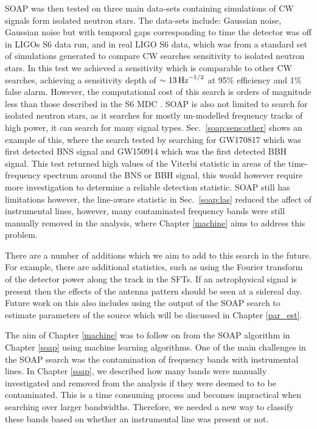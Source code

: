 SOAP was then tested on three main data-sets containing simulations of \gls{CW} signals form isolated neutron stars.
The data-sets include: Gaussian noise, Gaussian noise but with temporal gaps corresponding to time the detector was off in \glspl{LIGO} S6 data run, and in real \gls{LIGO} S6 data, which was from a standard set of simulations generated to compare \gls{CW} searches sensitivity to isolated neutron stars.
In this test we achieved a sensitivity which is comparable to other \gls{CW} searches, achieving a sensitivity depth of $\sim 13 \, \rm{Hz}^{-1/2}$ at 95\% efficiency and 1\% false alarm. 
However, the computational cost of this search is orders of magnitude less than those described in the S6 \gls{MDC} \citep{walsh2016ComparisonMethods}. 
SOAP is also not limited to search for isolated neutron stars, as it searches for mostly un-modelled frequency tracks of high power, it can search for many signal types.
Sec.~\ref{soap:sens:other} shows an example of this, where the search tested by searching for GW170817 which was first detected \gls{BNS} signal and GW150914 which was the first detected \gls{BBH} signal. 
This test returned high values of the Viterbi statistic in areas of the time-frequency spectrum around the \gls{BNS} or \gls{BBH} signal, this would however require more investigation to determine a reliable detection statistic.
SOAP still has limitations however, the line-aware statistic in Sec.~\ref{soap:las} reduced the affect of instrumental lines, however, many contaminated frequency bands were still manually removed in the analysis, where Chapter \ref{machine} aims to address this problem.

There are a number of additions which we aim to add to this search in the future. 
For example, there are additional statistics, such as using the Fourier transform of the detector power along the track in the \glspl{SFT}. 
If an astrophysical signal is present then the effects of the antenna pattern should be seen at a sidereal day.
Future work on this also includes using the output of the SOAP search to estimate parameters of the source which will be discussed in Chapter \ref{par_est}. 

\bigskip

The aim of Chapter \ref{machine} was to follow on from the SOAP algorithm in Chapter \ref{soap} using machine learning algorithms.
One of the main challenges in the SOAP search was the contamination of frequency bands with instrumental lines.
In Chapter \ref{soap}, we described how many bands were manually investigated and removed from the analysis if they were deemed to to be contaminated.
This is a time consuming process and becomes impractical when searching over larger bandwidths.
Therefore, we needed a new way to classify these bands based on whether an instrumental line was present or not.

